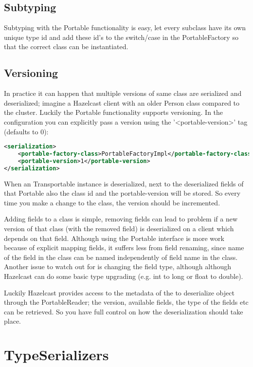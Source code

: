 \subsection*{Subtyping}
Subtyping with the Portable functionality is easy, let every subclass have its own unique type id and add these id's to the switch/case in the PortableFactory so that the correct class can be instantiated. 

\subsection*{Versioning}
In practice it can happen that multiple versions of same class are serialized and deserialized; imagine a Hazelcast client with an older Person class compared to the cluster. Luckily the Portable functionality supports versioning. In the configuration you can explicitly pass a version using the '<portable-version>' tag (defaults to 0):
\begin{lstlisting}[language=xml]
<serialization>
    <portable-factory-class>PortableFactoryImpl</portable-factory-class>
    <portable-version>1</portable-version>
</serialization>
\end{lstlisting}
When an Transportable instance is deserialized, next to the deserialized fields of that Portable also the class id and the portable-version will be stored. So every time you make a change to the class, the version should be incremented. 

Adding fields to a class is simple, removing fields can lead to problem if a new version of that class (with the removed field) is deserialized on a client which depends on that field. Although using the Portable interface is more work because of explicit mapping fields, it suffers less from field renaming, since name of the field in the class can be named independently of field name in the class. Another issue to watch out for is changing the field type, although although Hazelcast can do some basic type upgrading (e.g. int to long or float to double). 

Luckily Hazelcast provides access to the metadata of the to deserialize object through the PortableReader; the  version, available fields, the type of the fields etc can be retrieved. So you have full control on how the deserialization should take place. 

\section{TypeSerializers}

